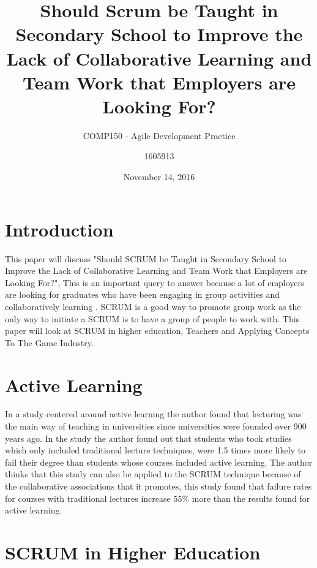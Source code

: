 \documentclass[11pt]{scrartcl}
\title{Should Scrum be Taught in Secondary School to Improve the Lack of Collaborative Learning and Team Work that Employers are Looking For?}
\date{November 14, 2016}
\subtitle{COMP150 - Agile Development Practice}
\author{1605913}
\begin{document}
\maketitle



\section{Introduction}

This paper will discuss "Should SCRUM be Taught in Secondary School to Improve the Lack of Collaborative Learning and Team Work that Employers are Looking For?", This is an important query to answer because a lot of employers are looking for graduates who have been engaging in group activities and collaboratively learning \cite{hansen2006benefits}. SCRUM is a good way to promote group work as the only way to initiate a SCRUM is to have a group of people to work with. This paper will look at SCRUM in higher education, Teachers and Applying Concepts To The Game Industry. 

\section{Active Learning}

In a study centered around active learning the author found that lecturing was the main way of teaching in universities since universities were founded over 900 years ago. In the study the author found out that students who took studies which only included traditional lecture techniques, were 1.5  times more likely to fail their degree than students whose courses included active learning\cite{freeman2014active}. The author thinks that this study can also be applied to the SCRUM technique because of the collaborative associations that it promotes, this study found that failure rates for courses with traditional lectures increase 55\% more than the results found for active learning. 

\section{SCRUM in Higher Education}
\end{document}
